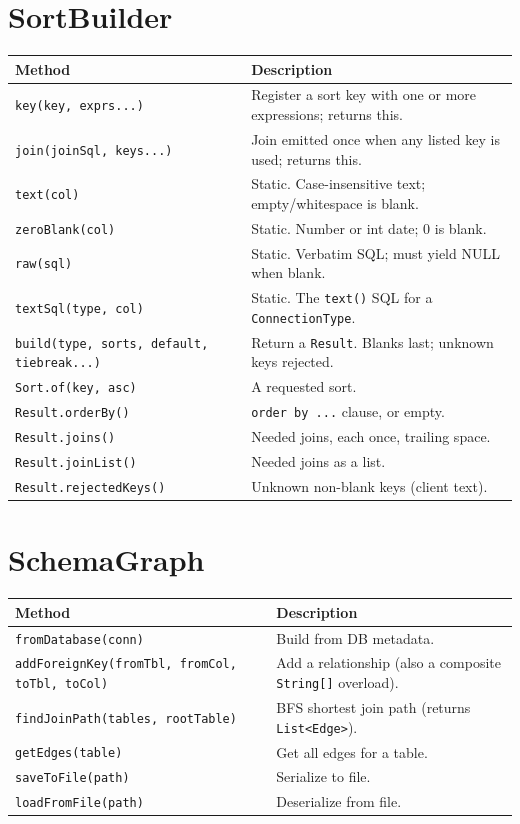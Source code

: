 \section{SortBuilder}
\label{sec:api-sortbuilder}

\begin{longtable}{P{4.8cm}P{5.7cm}}
\toprule
\textbf{Method} & \textbf{Description} \\
\midrule
\endhead
\texttt{key(key, exprs...)} & Register a sort key with one or more expressions; returns this. \\
\texttt{join(joinSql, keys...)} & Join emitted once when any listed key is used; returns this. \\
\texttt{text(col)} & Static. Case-insensitive text; empty/whitespace is blank. \\
\texttt{zeroBlank(col)} & Static. Number or int date; 0 is blank. \\
\texttt{raw(sql)} & Static. Verbatim SQL; must yield NULL when blank. \\
\texttt{textSql(type, col)} & Static. The \texttt{text()} SQL for a \texttt{ConnectionType}. \\
\texttt{build(type, sorts, default, tiebreak...)} & Return a \texttt{Result}. Blanks last; unknown keys rejected. \\
\texttt{Sort.of(key, asc)} & A requested sort. \\
\texttt{Result.orderBy()} & \texttt{order by ...} clause, or empty. \\
\texttt{Result.joins()} & Needed joins, each once, trailing space. \\
\texttt{Result.joinList()} & Needed joins as a list. \\
\texttt{Result.rejectedKeys()} & Unknown non-blank keys (client text). \\
\bottomrule
\end{longtable}

\section{SchemaGraph}
\label{sec:api-schemagraph}

\begin{longtable}{P{4.8cm}P{5.7cm}}
\toprule
\textbf{Method} & \textbf{Description} \\
\midrule
\endhead
\texttt{fromDatabase(conn)} & Build from DB metadata. \\
\texttt{addForeignKey(fromTbl, fromCol, toTbl, toCol)} & Add a relationship (also a composite \texttt{String[]} overload). \\
\texttt{findJoinPath(tables, rootTable)} & BFS shortest join path (returns \texttt{List<Edge>}). \\
\texttt{getEdges(table)} & Get all edges for a table. \\
\texttt{saveToFile(path)} & Serialize to file. \\
\texttt{loadFromFile(path)} & Deserialize from file. \\
\bottomrule
\end{longtable}

